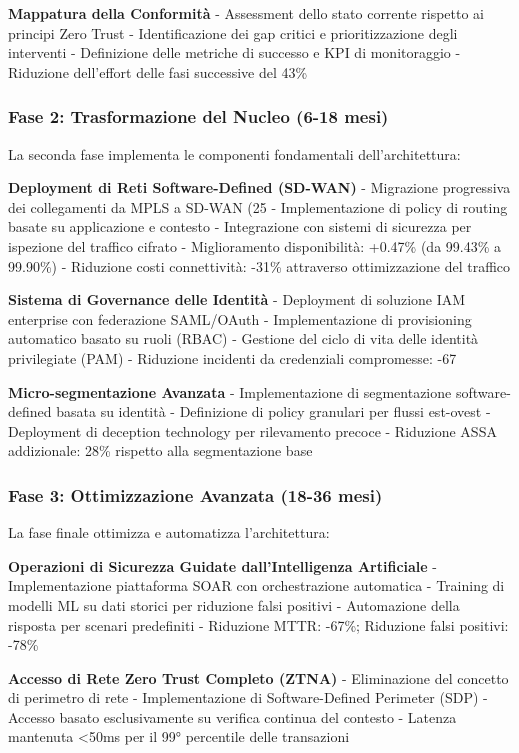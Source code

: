 \textbf{Mappatura della Conformità}
- Assessment dello stato corrente rispetto ai principi Zero Trust
- Identificazione dei gap critici e prioritizzazione degli interventi
- Definizione delle metriche di successo e KPI di monitoraggio
- Riduzione dell'effort delle fasi successive del 43\%

\subsubsection{Fase 2: Trasformazione del Nucleo (6-18 mesi)}

La seconda fase implementa le componenti fondamentali dell'architettura:

\textbf{Deployment di Reti Software-Defined (SD-WAN)}
- Migrazione progressiva dei collegamenti da MPLS a SD-WAN (25%
- Implementazione di policy di routing basate su applicazione e contesto
- Integrazione con sistemi di sicurezza per ispezione del traffico cifrato
- Miglioramento disponibilità: +0.47\% (da 99.43\% a 99.90\%)
- Riduzione costi connettività: -31\% attraverso ottimizzazione del traffico

\textbf{Sistema di Governance delle Identità}
- Deployment di soluzione IAM enterprise con federazione SAML/OAuth
- Implementazione di provisioning automatico basato su ruoli (RBAC)
- Gestione del ciclo di vita delle identità privilegiate (PAM)
- Riduzione incidenti da credenziali compromesse: -67%

\textbf{Micro-segmentazione Avanzata}
- Implementazione di segmentazione software-defined basata su identità
- Definizione di policy granulari per flussi est-ovest
- Deployment di deception technology per rilevamento precoce
- Riduzione ASSA addizionale: 28\% rispetto alla segmentazione base

\subsubsection{Fase 3: Ottimizzazione Avanzata (18-36 mesi)}

La fase finale ottimizza e automatizza l'architettura:

\textbf{Operazioni di Sicurezza Guidate dall'Intelligenza Artificiale}
- Implementazione piattaforma SOAR con orchestrazione automatica
- Training di modelli ML su dati storici per riduzione falsi positivi
- Automazione della risposta per scenari predefiniti
- Riduzione MTTR: -67\%; Riduzione falsi positivi: -78\%

\textbf{Accesso di Rete Zero Trust Completo (ZTNA)}
- Eliminazione del concetto di perimetro di rete
- Implementazione di Software-Defined Perimeter (SDP)
- Accesso basato esclusivamente su verifica continua del contesto
- Latenza mantenuta <50ms per il 99° percentile delle transazioni

